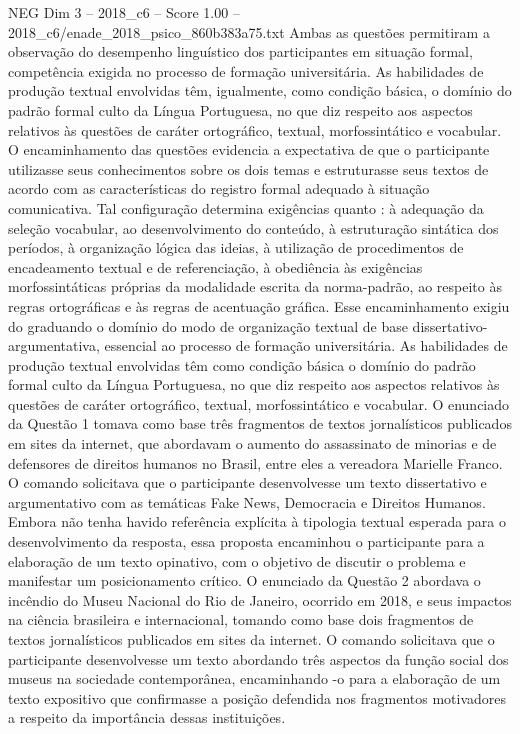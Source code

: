 \begin{textsample}{NEG Dim 3 – 2018\_c6 – Score 1.00 – 2018\_c6/enade\_2018\_psico\_860b383a75.txt}
Ambas as questões permitiram a observação do desempenho linguístico dos participantes em situação formal, competência exigida no processo de formação universitária.
As habilidades de produção textual envolvidas têm, igualmente, como condição básica, o domínio do padrão formal culto da Língua Portuguesa, no que diz respeito aos aspectos relativos às questões de caráter ortográfico, textual, morfossintático e vocabular.
O encaminhamento das questões evidencia a expectativa de que o participante utilizasse seus conhecimentos sobre os dois temas e estruturasse seus textos de acordo com as características do registro formal adequado à situação comunicativa.
Tal configuração determina exigências quanto : à adequação da seleção vocabular, ao desenvolvimento do conteúdo, à estruturação sintática dos períodos, à organização lógica das ideias, à utilização de procedimentos de encadeamento textual e de referenciação, à obediência às exigências morfossintáticas próprias da modalidade escrita da norma-padrão, ao respeito às regras ortográficas e às regras de acentuação gráfica.
Esse encaminhamento exigiu do graduando o domínio do modo de organização textual de base dissertativo-argumentativa, essencial ao processo de formação universitária.
As habilidades de produção textual envolvidas têm como condição básica o domínio do padrão formal culto da Língua Portuguesa, no que diz respeito aos aspectos relativos às questões de caráter ortográfico, textual, morfossintático e vocabular.
O enunciado da Questão 1 tomava como base três fragmentos de textos jornalísticos publicados em sites da internet, que abordavam o aumento do assassinato de minorias e de defensores de direitos humanos no Brasil, entre eles a vereadora Marielle Franco.
O comando solicitava que o participante desenvolvesse um texto dissertativo e argumentativo com as temáticas Fake News, Democracia e Direitos Humanos.
Embora não tenha havido referência explícita à tipologia textual esperada para o desenvolvimento da resposta, essa proposta encaminhou o participante para a elaboração de um texto opinativo, com o objetivo de discutir o problema e manifestar um posicionamento crítico.
O enunciado da Questão 2 abordava o incêndio do Museu Nacional do Rio de Janeiro, ocorrido em 2018, e seus impactos na ciência brasileira e internacional, tomando como base dois fragmentos de textos jornalísticos publicados em sites da internet.
O comando solicitava que o participante desenvolvesse um texto abordando três aspectos da função social dos museus na sociedade contemporânea, encaminhando -o para a elaboração de um texto expositivo que confirmasse a posição defendida nos fragmentos motivadores a respeito da importância dessas instituições.

\end{textsample}
